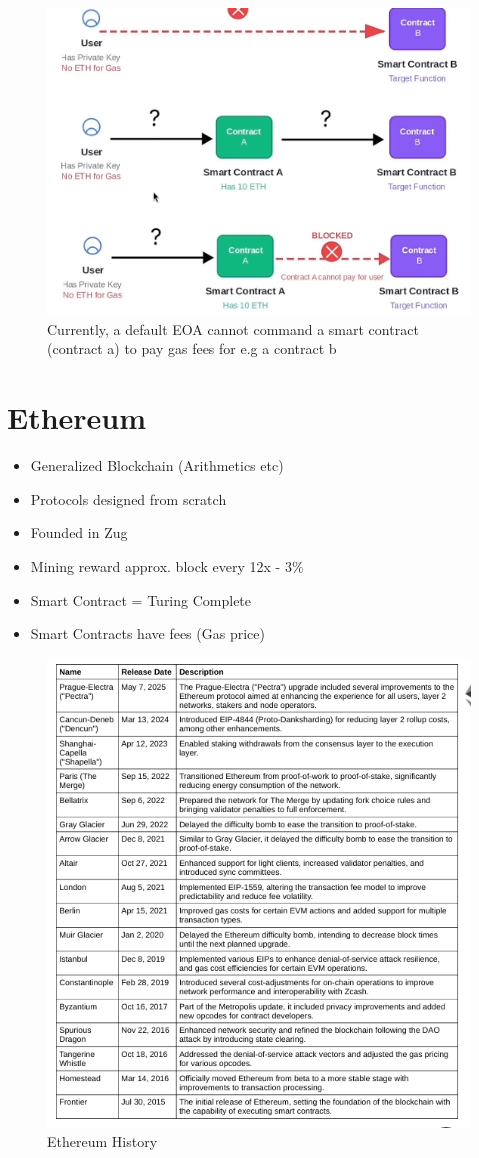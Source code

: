 \documentclass[../Main.tex]{subfiles}
\begin{document}
\begin{figure}[H]
    \centering
    \includegraphics[width=0.75\linewidth]{Images/blockchain/account-abs-motivation.png}
    \caption{Currently, a default EOA cannot command a smart contract (contract a) to pay gas fees for e.g a contract b}
\end{figure}

\section{Ethereum}
\begin{itemize}
    \item Generalized Blockchain (Arithmetics etc)
    \item Protocols designed from scratch
    \item Founded in Zug
    \item Mining reward approx. block every 12x - 3\%
    \item Smart Contract = Turing Complete
    \item Smart Contracts have fees (Gas price)
\end{itemize}

\begin{figure}[H]
    \centering
    \includegraphics[width=0.75\linewidth]{Images/blockchain/eth-history.png}
    \caption{Ethereum History}
\end{figure}
\end{document}
